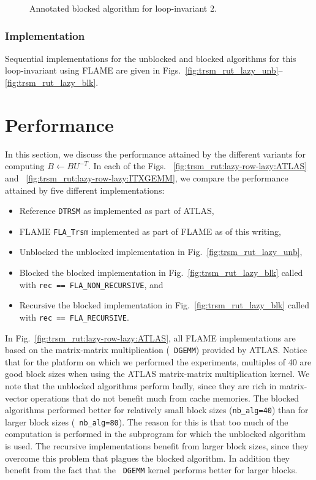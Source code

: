 \begin{figure}[htbp]
\worksheet
\caption{Annotated blocked algorithm for loop-invariant 2.}
\label{fig:ws:utrsm_rut:var2:blk}
\end{figure}
%

\subsubsection{Implementation}

Sequential implementations for the unblocked and blocked algorithms
for this loop-invariant using FLAME are given in
Figs.~\ref{fig:trsm_rut_lazy_unb}--\ref{fig:trsm_rut_lazy_blk}.

\section{Performance}

In this section, we discuss the performance attained by the different
variants for computing $ B \leftarrow B U^{-T} $.  In each of the Figs.
~\ref{fig:trsm_rut:lazy-row-lazy:ATLAS} and
~\ref{fig:trsm_rut:lazy-row-lazy:ITXGEMM}, we compare the performance
attained by five different implementations:
\begin{itemize}
\item{Reference}
{\tt DTRSM} as implemented as part of ATLAS,
\item{FLAME}
{\tt FLA\_Trsm} implemented as part of FLAME
as of this writing,
\item{Unblocked}
the unblocked implementation in Fig.~\ref{fig:trsm_rut_lazy_unb},
\item{Blocked}
the blocked implementation in Fig.~\ref{fig:trsm_rut_lazy_blk}
called with 
{\tt rec == 
%
FLA\_NON\_RECURSIVE}, and
\item{Recursive}
the blocked implementation in Fig.~\ref{fig:trsm_rut_lazy_blk}
called with 
{\tt rec == 
%
FLA\_RECURSIVE}.
\end{itemize}
In Fig.~\ref{fig:trsm_rut:lazy-row-lazy:ATLAS}, all FLAME
implementations are based on the matrix-matrix multiplication ({\tt
DGEMM}) provided by ATLAS.  Notice that for the platform on which we
performed the experiments, multiples of 40 are good block sizes when
using the ATLAS matrix-matrix multiplication kernel.  We note that the
unblocked algorithms perform badly, since they are rich in
matrix-vector operations that do not benefit much from cache memories.
The blocked algorithms performed better for relatively small block
sizes ({\tt nb\_alg=40}) than for larger block sizes ({\tt
nb\_alg=80}).  The reason for this is that too much of the
computation is performed in the subprogram for which the unblocked
algorithm is used.  The recursive implementations benefit from larger
block sizes, since they overcome this problem that plagues the blocked
algorithm.  In addition they benefit from the fact that the {\tt
DGEMM} kernel performs better for larger blocks.

